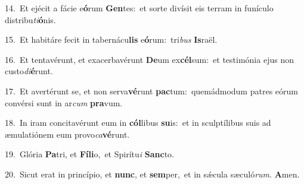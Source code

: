 {\numbfont\textcolor{\numbcolor}{14.}}~Et ejécit a fácie e\-\textbf{ó}\-rum \textbf{Gen}\-tes:~\star et sorte divísit eis terram in funículo distribu\-\textit{ti}\-\textbf{ó}nis.\par
{\numbfont\textcolor{\numbcolor}{15.}}~Et habitáre fecit in tabernácu\textbf{lis} e\-\textbf{ó}\-rum:~\star tri\textit{bus} \textbf{Is}\-raël.\par
{\numbfont\textcolor{\numbcolor}{16.}}~Et tentavérunt, et exacerbavérunt \textbf{De}\-um ex\-\textbf{cél}\-sum:~\star et testimónia ejus non custo\-\textit{di}\-\textbf{é}runt.\par
{\numbfont\textcolor{\numbcolor}{17.}}~Et avertérunt se, et non serva\-\textbf{vé}\-runt \textbf{pac}\-tum:~\star quemádmodum patres eórum convérsi sunt in ar\textit{cum} \textbf{pra}\-vum.\par
{\numbfont\textcolor{\numbcolor}{18.}}~In iram concitavérunt eum in \textbf{cól}\-libus \textbf{su}\-is:~\star et in sculptílibus suis ad æmulatiónem eum provo\-\textit{ca}\-\textbf{vé}runt.\par
{\numbfont\textcolor{\numbcolor}{19.}}~Glória \textbf{Pa}\-tri, et \textbf{Fí}\-\textbf{li}o,~\star et Spirítu\textit{i} \textbf{Sanc}\-to.\par
{\numbfont\textcolor{\numbcolor}{20.}}~Sicut erat in princípio, et \textbf{nunc}\-, et \textbf{sem}\-per,~\star et in sǽcula sæculó\-\textit{rum}\-. \textbf{A}\-men.\par
